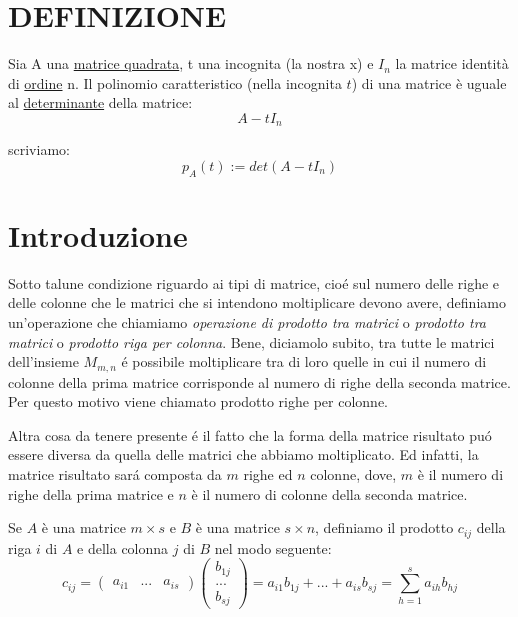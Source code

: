 \section{DEFINIZIONE}
Sia A una \href{./MatriceQuadrata.html}{matrice quadrata}, t una incognita (la nostra x) e $I_n$ la matrice identità di \href{./OrdineMatrice.html}{ordine} n. Il polinomio caratteristico (nella incognita $t$) di una matrice è uguale al \href{./DeterminanteMatrice.html}{determinante} della matrice:
\[
 A-tI_n
\]

scriviamo:
\[
 p_A(t) := det(A-tI_n)
\]



\section{Introduzione}
Sotto talune condizione riguardo ai tipi di matrice, cio\'{e} sul numero delle righe e delle colonne che le matrici che si intendono moltiplicare devono avere, definiamo un'operazione
che chiamiamo \textit{operazione di prodotto tra matrici} o \textit{prodotto tra matrici} o \textit{prodotto riga per colonna}.
Bene, diciamolo subito, tra tutte le matrici dell'insieme $M_{m,n}$ \'{e} possibile moltiplicare tra di loro quelle in cui il numero di colonne della prima matrice corrisponde al
numero di righe della seconda matrice. Per questo motivo viene chiamato prodotto righe per colonne.

Altra cosa da tenere presente \'{e} il fatto che la forma della matrice risultato pu\'{o} essere diversa da quella delle matrici che abbiamo moltiplicato. Ed infatti, la matrice risultato
sar\'{a} composta da $m$ righe ed $n$ colonne, dove, $m$ \`{e} il numero di righe della prima matrice e $n$ \`{e} il numero di colonne della seconda matrice.

\begin{definizione}
 Se $A$ \`{e} una matrice $m \times s$ e $B$ \`{e} una matrice $s \times n$, definiamo il prodotto $c_{ij}$ della riga $i$ di $A$ e della colonna $j$ di $B$ nel modo seguente:
 \[
  c_{ij} = \begin{pmatrix}
	      a_{i1} & ... & a_{is}
           \end{pmatrix}           
           \begin{pmatrix}
	      b_{1j} \\
	      ... \\
	      b_{sj}
           \end{pmatrix}
         = a_{i1}b_{1j} + ... + a_{is}b_{sj}
         = \sum_{h=1}^s a_{ih}b_{hj}
 \]

\end{definizione}

